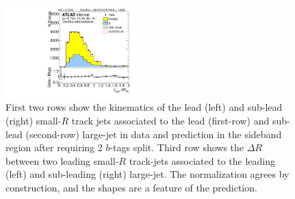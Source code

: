 \begin{figure}[htbp!]
\begin{center}
\includegraphics[width=0.45\textwidth,angle=-90]{figures/boosted/Sideband/b77_TwoTag_split_Sideband_sublHCand_trk_dr.pdf}
  \caption{First two rows show the kinematics of the lead (left) and sub-lead (right) small-$R$ track jets associated to the lead (first-row) and sub-lead (second-row) large-\R jet in data and prediction in the sideband region after requiring 2 $b$-tags split. Third row shows the $\Delta R$ between two leading small-$R$ track-jets associated to the leading (left) and sub-leading (right) large-\R jet. The normalization agrees by construction, and the shapes are a feature of the prediction. }
  \label{fig:boosted-2bs-sideband-ak2}
\end{center}
\end{figure}


